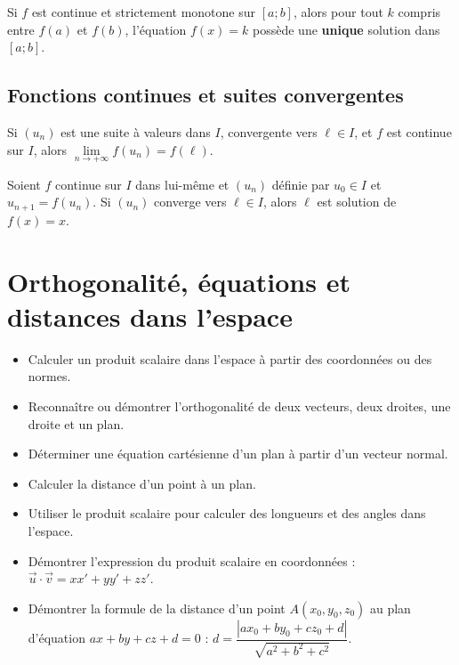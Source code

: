 \documentclass[11pt,a4paper,openany]{book}
\theoremstyle{definition}
\newcommand{\vc}[1]{\overrightarrow{#1}}
\newcommand{\nchap}{
    \setcounter{Définition}{0}
    \setcounter{Propriété}{0}
    \setcounter{Théorème}{0}
    \setcounter{Remarque}{0}
    \setcounter{Exemple}{0}
}
\begin{document}
    \begin{Théorème}[Corollaire]
        Si $f$ est continue et strictement monotone sur $[a;b]$, alors pour tout $k$ compris
        entre $f(a)$ et $f(b)$, l'équation $f(x)=k$ possède une \textbf{unique} solution
        dans $[a;b]$.
    \end{Théorème}

    \section{Fonctions continues et suites convergentes}
    \begin{Propriété}
        Si $(u_n)$ est une suite à valeurs dans $I$, convergente vers $\ell\in I$, et $f$ est
        continue sur $I$, alors $\lim\limits_{n\to+\infty}f(u_n)=f(\ell)$.
    \end{Propriété}

    \begin{Théorème}
        Soient $f$ continue sur $I$ dans lui-même et $(u_n)$ définie par $u_0\in I$ et
        $u_{n+1}=f(u_n)$.
        Si $(u_n)$ converge vers $\ell\in I$, alors $\ell$ est solution de $f(x)=x$.
    \end{Théorème}

    \chapter{Orthogonalité, équations et distances dans l'espace}
    \nchap

    \begin{capacitesbox}
    \begin{itemize}
        \item Calculer un produit scalaire dans l'espace à partir des coordonnées ou des normes.
        \item Reconnaître ou démontrer l'orthogonalité de deux vecteurs, deux droites, une droite et un plan.
        \item Déterminer une équation cartésienne d'un plan à partir d'un vecteur normal.
        \item Calculer la distance d'un point à un plan.
        \item Utiliser le produit scalaire pour calculer des longueurs et des angles dans l'espace.
    \end{itemize}
    \end{capacitesbox}

    \begin{demoprogbox}
    \begin{itemize}
        \item Démontrer l'expression du produit scalaire en coordonnées :
              $\vc{u}\cdot\vc{v}=xx'+yy'+zz'$.
        \item Démontrer la formule de la distance d'un point $A(x_0,y_0,z_0)$ au plan d'équation
              $ax+by+cz+d=0$ : $d=\dfrac{|ax_0+by_0+cz_0+d|}{\sqrt{a^2+b^2+c^2}}$.
    \end{itemize}
    \end{demoprogbox}
\end{document}
